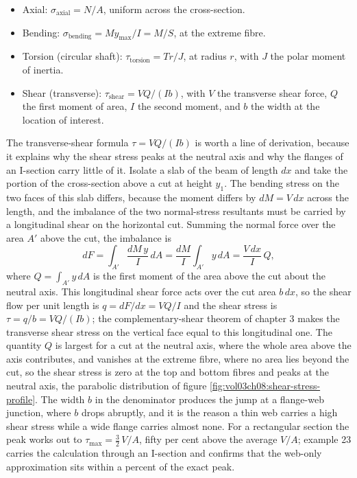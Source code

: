 \begin{itemize}[leftmargin=*]
  \item Axial: $\sigma_{\text{axial}} = N/A$, uniform across the
    cross-section.
  \item Bending: $\sigma_{\text{bending}} = M y_{\max}/I = M/S$, at
    the extreme fibre.
  \item Torsion (circular shaft): $\tau_{\text{torsion}} = T r/J$, at
    radius $r$, with $J$ the polar moment of inertia.
  \item Shear (transverse): $\tau_{\text{shear}} = VQ/(Ib)$, with $V$
    the transverse shear force, $Q$ the first moment of area, $I$
    the second moment, and $b$ the width at the location of
    interest.
\end{itemize}

The transverse-shear formula $\tau = VQ/(Ib)$ is worth a line of
derivation, because it explains why the shear stress peaks at the
neutral axis and why the flanges of an I-section carry little of it.
Isolate a slab of the beam of length $dx$ and take the portion of the
cross-section above a cut at height $y_1$. The bending stress on the two
faces of this slab differs, because the moment differs by $dM = V\,dx$
across the length, and the imbalance of the two normal-stress resultants
must be carried by a longitudinal shear on the horizontal cut. Summing
the normal force over the area $A'$ above the cut, the imbalance is
\[
dF = \int_{A'} \frac{dM\,y}{I}\,dA = \frac{dM}{I}\int_{A'} y\,dA
= \frac{V\,dx}{I}\,Q,
\]
where $Q = \int_{A'} y\,dA$ is the first moment of the area above the cut
about the neutral axis. This longitudinal shear force acts over the cut
area $b\,dx$, so the shear flow per unit length is $q = dF/dx = VQ/I$ and
the shear stress is $\tau = q/b = VQ/(Ib)$; the complementary-shear
theorem of chapter 3 makes the transverse shear stress on the vertical
face equal to this longitudinal one. The quantity $Q$ is largest for a
cut at the neutral axis, where the whole area above the axis contributes,
and vanishes at the extreme fibre, where no area lies beyond the cut, so
the shear stress is zero at the top and bottom fibres and peaks at the
neutral axis, the parabolic distribution of figure
\ref{fig:vol03ch08:shear-stress-profile}. The width $b$ in the
denominator produces the jump at a flange-web junction, where $b$ drops
abruptly, and it is the reason a thin web carries a high shear stress
while a wide flange carries almost none. For a rectangular section the
peak works out to $\tau_{\max} = \tfrac{3}{2}\,V/A$, fifty per cent above
the average $V/A$; example 23 carries the calculation through an
I-section and confirms that the web-only approximation sits within a
percent of the exact peak.

